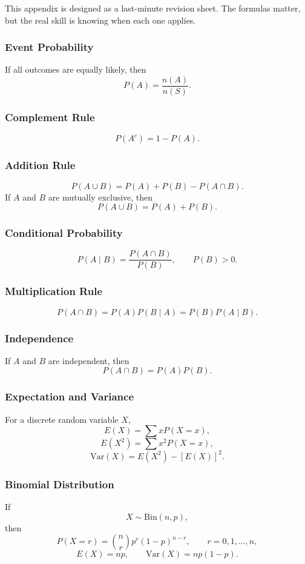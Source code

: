 \noindent This appendix is designed as a last-minute revision sheet. The formulas matter, but the real skill is knowing when each one applies.

\subsubsection*{Event Probability}
If all outcomes are equally likely, then
\[
P(A)=\frac{n(A)}{n(S)}.
\]

\subsubsection*{Complement Rule}
\[
P(A^c)=1-P(A).
\]

\subsubsection*{Addition Rule}
\[
P(A\cup B)=P(A)+P(B)-P(A\cap B).
\]
If $A$ and $B$ are mutually exclusive, then
\[
P(A\cup B)=P(A)+P(B).
\]

\subsubsection*{Conditional Probability}
\[
P(A\mid B)=\frac{P(A\cap B)}{P(B)},
\qquad P(B)>0.
\]

\subsubsection*{Multiplication Rule}
\[
P(A\cap B)=P(A)P(B\mid A)=P(B)P(A\mid B).
\]

\subsubsection*{Independence}
If $A$ and $B$ are independent, then
\[
P(A\cap B)=P(A)P(B).
\]

\subsubsection*{Expectation and Variance}
For a discrete random variable $X$,
\[
E(X)=\sum xP(X=x),
\]
\[
E(X^2)=\sum x^2P(X=x),
\]
\[
\mathrm{Var}(X)=E(X^2)-[E(X)]^2.
\]

\subsubsection*{Binomial Distribution}
If
\[
X\sim \mathrm{Bin}(n,p),
\]
then
\[
P(X=r)=\binom{n}{r}p^r(1-p)^{n-r},
\qquad r=0,1,\dots,n,
\]
\[
E(X)=np,
\qquad
\mathrm{Var}(X)=np(1-p).
\]

